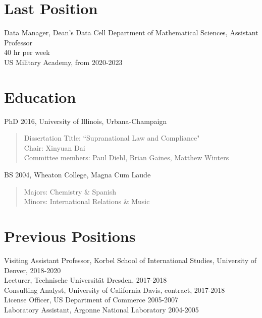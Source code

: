 \documentclass[margin, 10pt]{CVStyleTemplate}\usepackage[]{graphicx}\usepackage[dvipsnames]{xcolor}
\begin{document}
\begin{resume}

\section{Last Position}

Data Manager, Dean's Data Cell
Department of Mathematical Sciences, Assistant Professor \\
40 hr per week
\\
US Military Academy, from 2020-2023 \\


\section{Education}
PhD 2016, University of Illinois, Urbana-Champaign
  \begin{quotation} \noindent
  Dissertation Title: ``Supranational Law and Compliance"\\
  Chair: Xinyuan Dai\\
  Committee members: Paul Diehl, Brian Gaines, Matthew Winters
  \end{quotation}
BS 2004, Wheaton College, Magna Cum Laude
  \begin{quotation} \noindent
  Majors: Chemistry \& Spanish \\
  Minors: International Relations \& Music
  \end{quotation}
%


\section{Previous Positions}

Visiting Assistant Professor, Korbel School of International Studies, University of Denver,  2018-2020 \\
Lecturer, Technische Universit\"{a}t Dresden, 2017-2018 \\
Consulting Analyst, University of California Davis, contract, 2017-2018 \\
License Officer, US Department of Commerce 2005-2007 \\
Laboratory Assistant, Argonne National Laboratory 2004-2005 \\


\end{resume}
\end{document}
